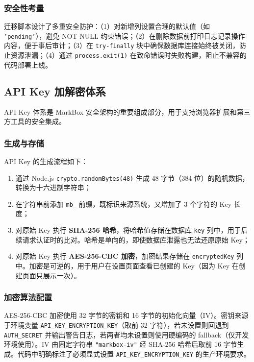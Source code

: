\documentclass[12pt,a4paper]{ctexart}
\begin{document}
\subsubsection{安全性考量}

迁移脚本设计了多重安全防护：（1）对新增列设置合理的默认值（如 \texttt{'pending'}），避免 NOT NULL 约束错误；（2）在删除数据前打印日志记录操作内容，便于事后审计；（3）在 \texttt{try-finally} 块中确保数据库连接始终被关闭，防止资源泄漏；（4）通过 \texttt{process.exit(1)} 在致命错误时失败构建，阻止不兼容的代码部署上线。

\subsection{API Key 加解密体系}

API Key 体系是 MarkBox 安全架构的重要组成部分，用于支持浏览器扩展和第三方工具的安全集成。

\subsubsection{生成与存储}

API Key 的生成流程如下：

\begin{enumerate}
  \item 通过 Node.js \texttt{crypto.randomBytes(48)} 生成 48 字节（384 位）的随机数据，转换为十六进制字符串；
  \item 在字符串前添加 \texttt{mb\_} 前缀，既标识来源系统，又增加了 3 个字符的 Key 长度；
  \item 对原始 Key 执行 \textbf{SHA-256 哈希}，将哈希值存储在数据库 \texttt{key} 列中，用于后续请求认证时的比对。哈希是单向的，即使数据库泄露也无法还原原始 Key；
  \item 对原始 Key 执行 \textbf{AES-256-CBC 加密}，加密结果存储在 \texttt{encryptedKey} 列中。加密是可逆的，用于用户在设置页面查看已创建的 Key（因为 Key 在创建页面只展示一次）。
\end{enumerate}

\subsubsection{加密算法配置}

AES-256-CBC 加密使用 32 字节的密钥和 16 字节的初始化向量（IV）。密钥来源于环境变量 \texttt{API\_KEY\_ENCRYPTION\_KEY}（取前 32 字符），若未设置则回退到 \texttt{AUTH\_SECRET} 并输出警告日志，若两者均未设置则使用硬编码的 fallback（仅开发环境使用）。IV 由固定字符串 \texttt{"markbox-iv"} 经 SHA-256 哈希后取前 16 字节生成。代码中明确标注了必须显式设置 \texttt{API\_KEY\_ENCRYPTION\_KEY} 的生产环境要求。
\end{document}
